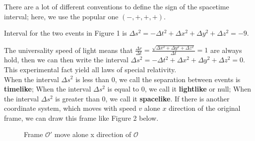 \documentclass[12pt]{article}
\theoremstyle{mystyle}{\newtheorem{definition}{Definition}[subsection]}
\theoremstyle{mystyle}{\newtheorem{theorem}[definition]{Theorem}}
\theoremstyle{mystyle}{\newtheorem*{remark}{Remark}}
\theoremstyle{mystyle}{\newtheorem{example}{Example}[subsection]}
\theoremstyle{mystyle}{\newtheorem{examples}{Examples}[subsection]}
\theoremstyle{mystyle}{\newtheorem{cthm}{}[subsection]}
\begin{document}
\begin{remark}\leavevmode
  There are a lot of different conventions to define the sign of the spacetime interval; here, we use the popular one \((-,+,+,+)\).
\end{remark}
\begin{example}\leavevmode %
  Interval for the two events in Figure 1 is $\Delta s^2 = - \Delta t^2 + \Delta x^2 + \Delta y^2 + \Delta z^2 = -9$.
\end{example}
The universality speed of light means that $\frac{\Delta r}{\Delta t} = \frac{\sqrt{\Delta x^2+ \Delta y^2 + \Delta z^2}}{\Delta t}=1$
are always hold, then we can then write the interval
$\Delta s^2 = - \Delta t^2 + \Delta x^2 + \Delta y^2 + \Delta z^2 = 0$. This experimental fact yield all laws of special relativity.
\\
When the interval $\Delta s^2$ is less than 0, we call the separation between events is \textbf{timelike};
When the interval $\Delta s^2$ is equal to 0, we call it \textbf{lightlike} or null;
When the interval $\Delta s^2$ is greater than 0, we call it \textbf{spacelike}.
If there is another coordinate system, which moves with speed \(v\) alone \(x\) direction of the original frame,
we can draw this frame like Figure 2 below.
\begin{figure}[ht]
  \begin{center}
    \caption[]{Frame \(\mathcal{O}'\) move alone x direction of \(\mathcal{O}\)}
  \end{center}
\end{figure}
\end{document}
